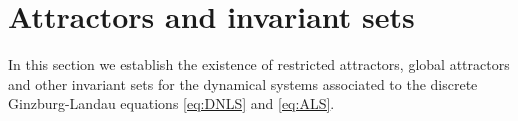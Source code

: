 \documentclass[preprintnumbers,amsmath,amssymb]{revtex4}
\newtheorem{definition}{Definition}[section]
\begin{document}
\section{Attractors and invariant sets}\label{section:attractors}
\setcounter{equation}{0}
In this section we establish the existence of restricted attractors, global attractors and other invariant sets for the dynamical systems associated to the discrete Ginzburg-Landau equations \eqref{eq:DNLS} and \eqref{eq:ALS}. 
\vspace{0.5cm}
\end{document}
